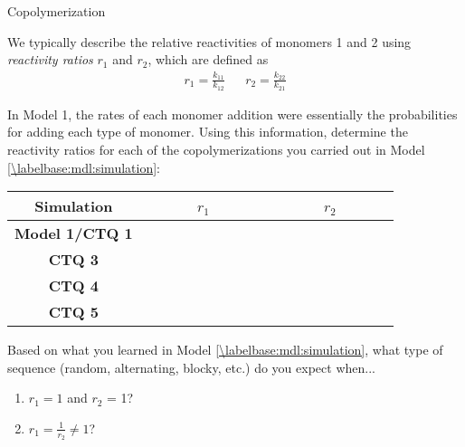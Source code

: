 \begin{activity}{Copolymerization}
\begin{ctqs}
		\begin{solution}[1.5in]
		\end{solution}
	
\end{ctqs}

\begin{infobox}

	We typically  describe the relative reactivities of monomers 1 and 2 using \emph{reactivity ratios} $r_1$ and $r_2$, which are defined as
	\begin{align*}
		r_1 = \frac{k_{11}}{k_{12}} && r_2 = \frac{k_{22}}{k_{21}}
	\end{align*}

\end{infobox}

\begin{ctqs}

	\question In Model 1, the rates of each monomer addition were essentially the probabilities for adding each type of monomer.  Using this information, determine the reactivity ratios for each of the copolymerizations you carried out in Model \ref{\labelbase:mdl:simulation}:
	
		\begin{center}
		\renewcommand{\arraystretch}{2.5}
		\begin{tabular}{|c|c|c|}
			\hline
			\textbf{Simulation} & ~~~~~~$r_1$~~~~~~ & ~~~~~~$r_2$~~~~~~ \\\hline
			\textbf{Model 1/CTQ 1} & & \\\hline
			\textbf{CTQ 3} & & \\\hline
			\textbf{CTQ 4} & & \\\hline
			\textbf{CTQ 5} & & \\\hline
		\end{tabular}
		\end{center}

	\question Based on what you learned in Model \ref{\labelbase:mdl:simulation}, what type of sequence (random, alternating, blocky, etc.) do you expect when...
	
		\begin{enumerate}
			\item $r_1 = 1$ and $r_2$ = 1?
			
				\begin{solution}[0.25in]
				\end{solution}
			
			\item $r_1 = \frac{1}{r_2} \neq 1$?
			

\end{enumerate}
\end{ctqs}
\end{activity}
